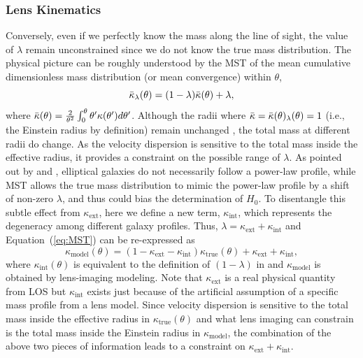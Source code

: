 \documentclass[useAMS,usenatbib]{mnras}
\newcommand{\eref}[1]{Equation~(\ref{#1})}
\begin{document}
\subsubsection{Lens Kinematics}
\label{sec:kinematics}
Conversely, even if we perfectly know the mass along the line of sight, the value of $\lambda$ remain unconstrained since we do not know the true mass distribution. 
The physical picture can be roughly understood by the MST of the mean cumulative dimensionless mass distribution (or mean convergence) within $\theta$,
\begin{equation}
\label{eq:enclosedmass}
    \Bar{\kappa}_{\lambda}(\theta)=(1-\lambda)\Bar{\kappa}(\theta)+\lambda,
\end{equation}
where $\Bar{\kappa}(\theta)=\frac{2}{\theta^{2}}\int^{\theta}_{0}\theta^{\prime}\kappa(\theta^{\prime})d\theta^{\prime}$. Although the radii where $\Bar{\kappa} =\Bar{\kappa}(\theta)_{\lambda}(\theta)=1$ (i.e., the Einstein radius by definition) remain unchanged \citep[e.g.,][]{XuEtal16}, the total mass at different radii do change. As the velocity dispersion is sensitive to the total mass inside the effective radius, it provides a constraint on the possible range of $\lambda$. %
As pointed out by \citet{SchneiderSluse13} and \citet{XuEtal16}, elliptical galaxies do not necessarily follow a power-law profile, while MST allows the true mass distribution to mimic the power-law profile by a shift of non-zero $\lambda$, and thus could bias the determination of $H_{0}$. 
To disentangle this subtle effect from $\kappa_{\textrm{ext}}$, here we define a new term, $\kappa_{\textrm{int}}$, which represents the degeneracy among different galaxy profiles. Thus, 
$\lambda=\kappa_{\textrm{ext}}+\kappa_{\textrm{int}}$ and \eref{eq:MST} can be re-expressed as
\begin{equation}
    \kappa_{\textrm{model}}(\theta)=(1-\kappa_{\textrm{ext}}-\kappa_{\textrm{int}})\kappa_{\textrm{true}}(\theta)+\kappa_{\textrm{ext}}+\kappa_{\textrm{int}},
\end{equation}
where $\kappa_{\textrm{int}}(\theta)$ is equivalent to the definition of $(1-\lambda)$ in \citet{XuEtal16} and $\kappa_{\textrm{model}}$ is obtained by lens-imaging modeling. Note that $\kappa_{\textrm{ext}}$ is a real physical quantity from LOS but $\kappa_{\textrm{int}}$ exists just because of the artificial assumption of a specific mass profile from a lens model.
Since velocity dispersion is sensitive to the total mass inside the effective radius in $\kappa_{\textrm{true}}(\theta)$ and what lens imaging can constrain is the total mass inside the Einstein radius in $\kappa_{\textrm{model}}$, the combination of the above two pieces of information leads to a constraint on $\kappa_{\textrm{ext}}+\kappa_{\textrm{int}}$.
\end{document}
